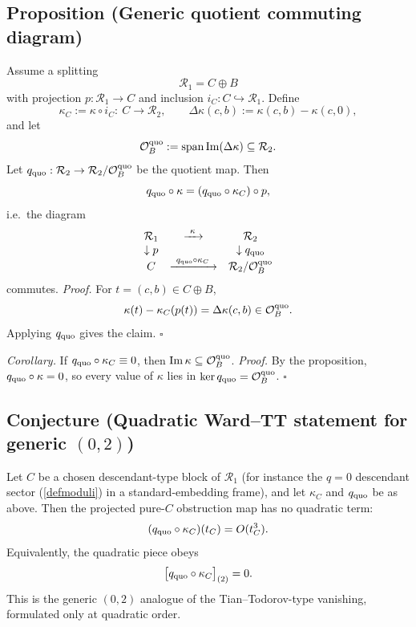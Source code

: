 \documentclass[12pt]{article}
\begin{document}
		\subsection*{Proposition (Generic quotient commuting diagram)}
		Assume a splitting
		\[
		\mathcal R_1=C\oplus B
		\]
		with projection $p:\mathcal R_1\to C$ and inclusion $i_C:C\hookrightarrow \mathcal R_1$. Define
		\[
		\kappa_C:=\kappa\circ i_C:\ C\to \mathcal R_2,
		\qquad
		\Delta\kappa(c,b):=\kappa(c,b)-\kappa(c,0),
		\]
		and let
		\[
		\mathcal O_B^{\rm quo}:=\mathrm{span}\,\mathrm{Im}(\Delta\kappa)\subseteq \mathcal R_2.
		\]
		Let $q_{\rm quo}:\mathcal R_2\to \mathcal R_2/\mathcal O_B^{\rm quo}$ be the quotient map. Then
		\[
		q_{\rm quo}\circ\kappa
		=
		(q_{\rm quo}\circ\kappa_C)\circ p,
		\]
		i.e.\ the diagram
		\[
		\begin{array}{ccc}
		\mathcal R_1 & \xrightarrow{\ \kappa\ } & \mathcal R_2\\
		\downarrow p & & \downarrow q_{\rm quo}\\
		C & \xrightarrow{\ q_{\rm quo}\circ\kappa_C\ } & \mathcal R_2/\mathcal O_B^{\rm quo}
		\end{array}
		\]
		commutes.
		\textit{Proof.}
		For $t=(c,b)\in C\oplus B$,
		\[
		\kappa(t)-\kappa_C(p(t))=\Delta\kappa(c,b)\in\mathcal O_B^{\rm quo}.
		\]
		Applying $q_{\rm quo}$ gives the claim. \hfill$\square$
		
		\textit{Corollary.}
		If $q_{\rm quo}\circ\kappa_C\equiv 0$, then $\mathrm{Im}\,\kappa\subseteq \mathcal O_B^{\rm quo}$.
		\textit{Proof.}
		By the proposition, $q_{\rm quo}\circ\kappa=0$, so every value of $\kappa$ lies in $\ker q_{\rm quo}=\mathcal O_B^{\rm quo}$. \hfill$\square$
		
		\subsection*{Conjecture (Quadratic Ward--TT statement for generic $(0,2)$)}
		Let $C$ be a chosen descendant-type block of $\mathcal R_1$ (for instance the $q=0$ descendant sector (\ref{defmoduli}) in a standard-embedding frame), and let $\kappa_C$ and $q_{\rm quo}$ be as above. Then the projected pure-$C$ obstruction map has no quadratic term:
		\[
		(q_{\rm quo}\circ\kappa_C)(t_C)=O(t_C^3).
		\]
		Equivalently, the quadratic piece obeys
		\[
		\big[q_{\rm quo}\circ\kappa_C\big]_{(2)}=0.
		\]
		This is the generic $(0,2)$ analogue of the Tian--Todorov-type vanishing, formulated only at quadratic order.
		
\end{document}
